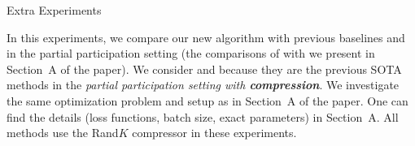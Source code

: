 \documentclass[10pt]{article}
\begin{document}
\vspace{-8cm}
\begin{center}
    Extra Experiments
\end{center}
In this experiments, we compare our new algorithm  with previous baselines  and  in the partial participation setting (the comparisons of  with  we present in Section~A of the paper). We consider  and  because they are the previous SOTA methods in the \emph{partial participation setting with {\bf compression}}. We investigate the same optimization problem and setup as in Section~A of the paper. One can find the details (loss functions, batch size, exact parameters) in Section~A. All methods use the Rand$K$ compressor in these experiments.
\end{document}
